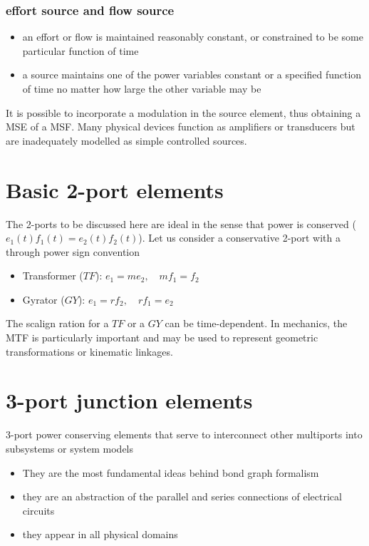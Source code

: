 \documentclass{book}
\begin{document}
\subsubsection{effort source and flow source}
\begin{itemize}
    \item an effort or flow is maintained reasonably constant, or constrained to be some particular function of time 
    \item a source maintains one of the power variables constant or a specified function of time no matter how large the other variable may be
\end{itemize}
It is possible to incorporate a modulation in the source element, thus obtaining a MSE of a MSF. Many physical devices function as amplifiers or transducers but are inadequately modelled as simple controlled sources.

\section{Basic 2-port elements}

The 2-ports to be discussed here are ideal in the sense that power is conserved ($e_1(t)f_1(t) = e_2(t)f_2(t)$). Let us consider a conservative 2-port with a through power sign convention
\begin{itemize}
    \item Transformer ($TF$): $e_1 = me_2, \quad mf_1=f_2$
    \item Gyrator ($GY$): $e_1=rf_2, \quad rf_1=e_2$
\end{itemize}

The scalign ration for a $TF$ or a $GY$ can be time-dependent. In mechanics, the MTF is particularly important and may be used to represent geometric transformations or kinematic linkages.

\section{3-port junction elements}
3-port power conserving elements that serve to interconnect other multiports into subsystems or system models 
\begin{itemize}
    \item They are the most fundamental ideas behind bond graph formalism
    \item they are an abstraction of the parallel and series connections of electrical circuits 
    \item they appear in all physical domains
\end{itemize}
\end{document}
